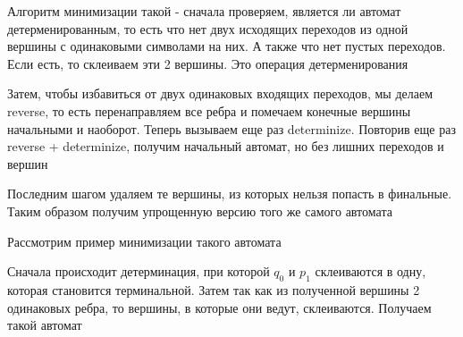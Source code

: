 Алгоритм минимизации такой - сначала проверяем, является ли автомат детерменированным, то есть что нет двух исходящих переходов из одной вершины с одинаковыми символами на них. А также что нет пустых переходов. Если есть, то склеиваем эти 2 вершины. Это операция детерменирования

Затем, чтобы избавиться от двух одинаковых входящих переходов, мы делаем reverse, то есть перенаправляем все ребра и помечаем конечные вершины начальными и наоборот. Теперь вызываем еще раз determinize. Повторив еще раз reverse + determinize, получим начальный автомат, но без лишних переходов и вершин

Последним шагом удаляем те вершины, из которых нельзя попасть в финальные. Таким образом получим упрощенную версию того же самого автомата

Рассмотрим пример минимизации такого автомата\\


Сначала происходит детерминация, при которой $q_0$ и $p_1$ склеиваются в одну, которая становится терминальной. Затем так как из полученной вершины 2 одинаковых ребра, то вершины, в которые они ведут, склеиваются. Получаем такой автомат\\


